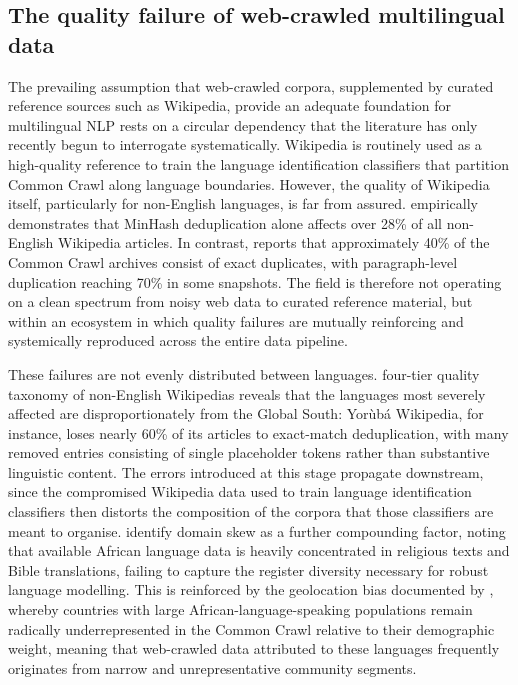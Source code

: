 \documentclass[11pt,a4paper]{article}
\begin{document}
\subsection{The quality failure of web-crawled multilingual data}

The prevailing assumption that web-crawled corpora, supplemented by curated reference sources such as Wikipedia, provide an adequate foundation for multilingual NLP rests on a circular dependency that the literature has only recently begun to interrogate systematically. Wikipedia is routinely used as a high-quality reference to train the language identification classifiers that partition Common Crawl along language boundaries. However, the quality of Wikipedia itself, particularly for non-English languages, is far from assured. \citet{tatariya2024good} empirically demonstrates that MinHash deduplication alone affects over 28\% of all non-English Wikipedia articles. In contrast, \citet{perelkiewicz2024review} reports that approximately 40\% of the Common Crawl archives consist of exact duplicates, with paragraph-level duplication reaching 70\% in some snapshots. The field is therefore not operating on a clean spectrum from noisy web data to curated reference material, but within an ecosystem in which quality failures are mutually reinforcing and systemically reproduced across the entire data pipeline.

These failures are not evenly distributed between languages. \citet{tatariya2024good} four-tier quality taxonomy of non-English Wikipedias reveals that the languages most severely affected are disproportionately from the Global South: Yorùbá Wikipedia, for instance, loses nearly 60\% of its articles to exact-match deduplication, with many removed entries consisting of single placeholder tokens rather than substantive linguistic content. The errors introduced at this stage propagate downstream, since the compromised Wikipedia data used to train language identification classifiers then distorts the composition of the corpora that those classifiers are meant to organise. \citet{kwon2026afroscope} identify domain skew as a further compounding factor, noting that available African language data is heavily concentrated in religious texts and Bible translations, failing to capture the register diversity necessary for robust language modelling. This is reinforced by the geolocation bias documented by \citet{perelkiewicz2024review}, whereby countries with large African-language-speaking populations remain radically underrepresented in the Common Crawl relative to their demographic weight, meaning that web-crawled data attributed to these languages frequently originates from narrow and unrepresentative community segments.
\end{document}

